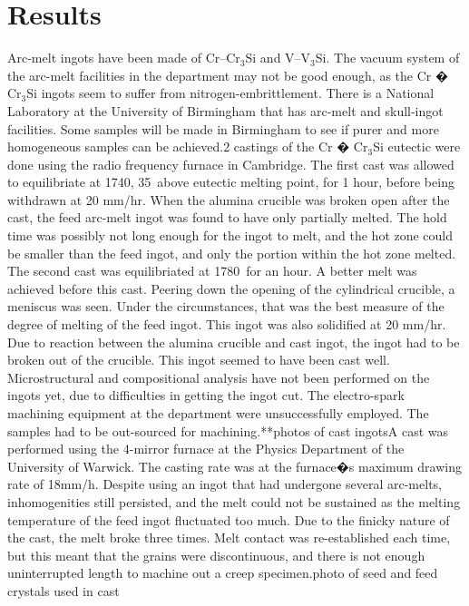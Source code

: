 \section{Results}
Arc-melt ingots have been made of Cr--Cr$_3$Si and V--V$_3$Si. The vacuum system of the arc-melt facilities in the department may not be good enough, as the Cr � Cr$_3$Si ingots seem to suffer from nitrogen-embrittlement. There is a National Laboratory at the University of Birmingham that has arc-melt and skull-ingot facilities. Some samples will be made in Birmingham to see if purer and more homogeneous samples can be achieved.2 castings of the Cr � Cr$_3$Si eutectic were done using the radio frequency furnace in Cambridge. The first cast was allowed to equilibriate at 1740\celsius, 35\celsius\ above eutectic melting point, for 1 hour, before being withdrawn at 20 mm/hr. When the alumina crucible was broken open after the cast, the feed arc-melt ingot was found to have only partially melted. The hold time was possibly not long enough for the ingot to melt, and the hot zone could be smaller than the feed ingot, and only the portion within the hot zone melted. The second cast was equilibriated at 1780\celsius\ for an hour. A better melt was achieved before this cast. Peering down the opening of the cylindrical crucible, a meniscus was seen. Under the circumstances, that was the best measure of the degree of melting of the feed ingot. This ingot was also solidified at 20 mm/hr. Due to reaction between the alumina crucible and cast ingot, the ingot had to be broken out of the crucible. This ingot seemed to have been cast well. Microstructural and compositional analysis have not been performed on the ingots yet, due to difficulties in getting the ingot cut. The electro-spark machining equipment at the department were unsuccessfully employed. The samples had to be out-sourced for machining.**photos of cast ingotsA cast was performed using the 4-mirror furnace at the Physics Department of the University of Warwick. The casting rate was at the furnace�s maximum drawing rate of 18mm/h. Despite using an ingot that had undergone several arc-melts, inhomogenities still persisted, and the melt could not be sustained as the melting temperature of the feed ingot fluctuated too much. Due to the finicky nature of the cast, the melt broke three times. Melt contact was re-established each time, but this meant that the grains were discontinuous, and there is not enough uninterrupted length to machine out a creep specimen.photo of seed and feed crystals used in cast
%
